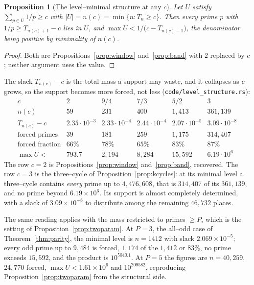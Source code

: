 \documentclass[11pt]{article}
\newtheorem{proposition}[theorem]{Proposition}
\theoremstyle{definition}
\begin{document}
\begin{proposition}[The level--minimal structure at any $c$]\label{prop:levelstructure}
Let $U$ satisfy $\sum_{p\in U}1/p\ge c$ with $|U|=n(c)=\min\{n:T_n\ge c\}$. Then every prime $p$ with
$1/p\ge T_{n(c)+1}-c$ lies in $U$, and $\max U<1/\bigl(c-T_{n(c)-1}\bigr)$, the denominator being
positive by minimality of $n(c)$.
\end{proposition}
\begin{proof}
Both are Propositions~\ref{prop:window} and~\ref{prop:band} with $2$ replaced by $c$; neither
argument uses the value.
\end{proof}

The slack $T_{n(c)}-c$ is the total mass a support may waste, and it collapses as $c$ grows, so the
support becomes more forced, not less \textup{(\texttt{code/level\_structure.rs})}:
\[
\begin{array}{l|ccccc}
c & 2 & 9/4 & 7/3 & 5/2 & 3\\\hline
n(c) & 59 & 231 & 400 & 1{,}413 & 361{,}139\\
T_{n(c)}-c & 2.35\!\cdot\!10^{-3} & 2.33\!\cdot\!10^{-4} & 2.44\!\cdot\!10^{-4} &
  2.07\!\cdot\!10^{-5} & 3.09\!\cdot\!10^{-8}\\
\text{forced primes} & 39 & 181 & 259 & 1{,}175 & 314{,}407\\
\text{forced fraction} & 66\% & 78\% & 65\% & 83\% & 87\%\\
\max U< & 793.7 & 2{,}194 & 8{,}284 & 15{,}592 & 6.19\!\cdot\!10^{6}
\end{array}
\]
The row $c=2$ is Propositions~\ref{prop:window} and~\ref{prop:band}, recovered. The row $c=3$ is the
three--cycle of Proposition~\ref{prop:kcycles}: at its minimal level a three--cycle contains
\emph{every} prime up to $4{,}476{,}608$, that is $314{,}407$ of its $361{,}139$, and no prime beyond
$6.19\times10^{6}$. Its support is almost completely determined, with a slack of $3.09\times10^{-8}$
to distribute among the remaining $46{,}732$ places.

The same reading applies with the mass restricted to primes $\ge P$, which is the setting of
Proposition~\ref{prop:twoparam}. At $P=3$, the all--odd case of Theorem~\ref{thm:parity}, the
minimal level is $n=1412$ with slack $2.069\times10^{-5}$; every odd prime up to $9{,}484$ is forced,
$1{,}174$ of the $1{,}412$ or $83\%$, no prime exceeds $15{,}592$, and the product is $10^{5040.1}$.
At $P=5$ the figures are $n=40{,}259$, $24{,}770$ forced, $\max U<1.61\times10^{6}$ and $10^{209582}$,
reproducing Proposition~\ref{prop:twoparam} from the structural side.
\end{document}
